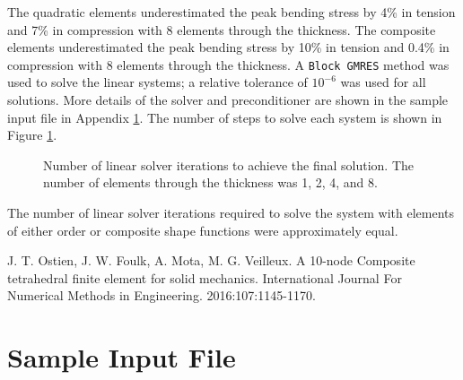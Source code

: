 \documentclass[a4paper, 12pt]{article}
\begin{document}
The quadratic elements underestimated
the peak bending stress by 4\% in tension and 7\% in compression 
with 8 elements through the thickness.
The composite elements underestimated
the peak bending stress by 10\% in tension and 0.4\% in compression
with 8 elements through the thickness.
A \texttt{Block GMRES} method was used to solve the linear systems;
a relative tolerance of $10^{-6}$ was used for all solutions.
More details of the solver and preconditioner are shown in 
the sample input file in Appendix \ref{app_input_file}.
The number of steps to solve each system is shown in 
Figure \ref{fig:iterations}.


\begin{figure}[H]
  \centering
  \caption{Number of linear solver iterations to achieve the final solution.
           The number of elements through the thickness was 1, 2, 4, and 8.}
  \label{fig:iterations}
\end{figure}

The number of linear solver iterations required to solve 
the system with elements of either  order or composite
shape functions were approximately equal.

\newpage
\begin{thebibliography}{99}

J. T. Ostien,
J. W. Foulk,
A. Mota,
M. G. Veilleux.
A 10-node Composite tetrahedral finite element for solid mechanics.
International Journal For Numerical Methods in Engineering.
2016:107:1145-1170. 

\end{thebibliography}

\newpage
\appendix

\section{Sample Input File} \label{app_input_file}

\end{document}

